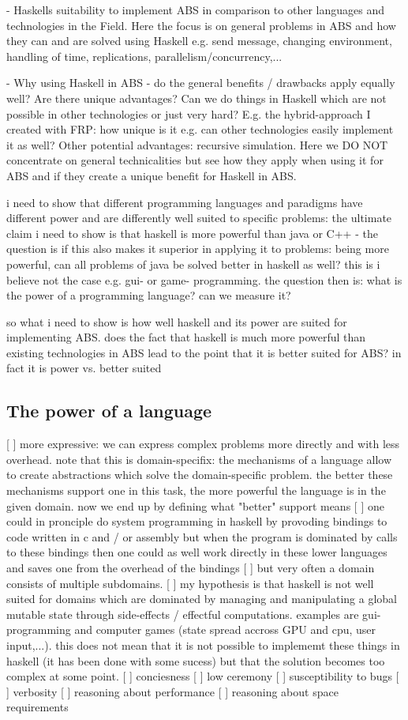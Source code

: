 - Haskells suitability to implement ABS in comparison to other languages and technologies in the Field. Here the focus is on general problems in ABS and how they can and are solved using Haskell e.g. send message, changing environment, handling of time, replications, parallelism/concurrency,...

- Why using Haskell in ABS - do the general benefits / drawbacks apply equally well? Are there unique advantages? Can we do things in Haskell which are not possible in other technologies or just very hard? E.g. the hybrid-approach I created with FRP: how unique is it e.g. can other technologies easily implement it as well? Other potential advantages: recursive simulation. Here we DO NOT concentrate on general technicalities but see how they apply when using it for ABS and if they create a unique benefit for Haskell in ABS.

i need to show that different programming languages and paradigms have different power and are differently well suited to specific problems: the ultimate claim i need to show is that haskell is more powerful than java or C++ - the question is if this also makes it superior in applying it to problems: being more powerful, can all problems of java be solved better in haskell as well? this is i believe not the case e.g. gui- or game- programming. the question then is: what is the power of a programming language? can we measure it?

so what i need to show is how well haskell and its power are suited for implementing ABS. does the fact that haskell is much more powerful than existing technologies in ABS lead to the point that it is better suited for ABS? in fact it is power vs. better suited

\subsection{The power of a language}
[ ] more expressive: we can express complex problems more directly and with less  overhead. note that this is domain-specifix: the mechanisms of a language allow to create abstractions which solve the domain-specific problem. the better these mechanisms support one in this task, the more powerful the language is in the given domain. now we end up by defining what "better" support means
[ ] one could in pronciple do system programming in haskell by provoding bindings to code written in c and / or assembly but when the program is dominated by calls to these bindings then one could as well work directly in these lower languages and saves one from the overhead of the bindings
[ ] but very often a domain consists of multiple subdomains.
[ ] my hypothesis is that haskell is not well suited for domains which are dominated by managing and manipulating a global mutable state through side-effects / effectful computations. examples are gui-programming and computer games (state spread accross GPU and cpu, user input,...). this does not mean that it is not possible to implememt these things in haskell (it has been done with some sucess) but that the solution becomes too complex at some point.
[ ] conciesness
[ ] low ceremony
[ ] susceptibility to bugs
[ ] verbosity
[ ] reasoning about performance
[ ] reasoning about space requirements

